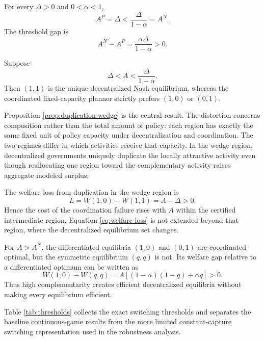 \begin{proposition}
\label{prop:threshold-ordering}
For every $\Delta>0$ and $0<\alpha<1$,
\begin{equation}
A^P=\Delta
<\frac{\Delta}{1-\alpha}=A^N.
\label{eq:threshold-ordering}
\end{equation}
The threshold gap is
\begin{equation}
A^N-A^P
=\frac{\alpha\Delta}{1-\alpha}>0.
\label{eq:threshold-gap}
\end{equation}
\end{proposition}

\begin{proposition}
\label{prop:duplication-wedge}
Suppose
\begin{equation}
\Delta<A<\frac{\Delta}{1-\alpha}.
\label{eq:wedge-region}
\end{equation}
Then $(1,1)$ is the unique decentralized Nash equilibrium, whereas the coordinated fixed-capacity planner strictly prefers $(1,0)$ or $(0,1)$.
\end{proposition}

Proposition \ref{prop:duplication-wedge} is the central result. The distortion concerns composition rather than the total amount of policy: each region has exactly the same fixed unit of policy capacity under decentralization and coordination. The two regimes differ in which activities receive that capacity. In the wedge region, decentralized governments uniquely duplicate the locally attractive activity even though reallocating one region toward the complementary activity raises aggregate modeled surplus.

The welfare loss from duplication in the wedge region is
\begin{equation}
L
=W(1,0)-W(1,1)
=A-\Delta>0.
\label{eq:welfare-loss}
\end{equation}
Hence the cost of the coordination failure rises with $A$ within the certified intermediate region. Equation \eqref{eq:welfare-loss} is not extended beyond that region, where the decentralized equilibrium set changes.

For $A>A^N$, the differentiated equilibria $(1,0)$ and $(0,1)$ are coordinated-optimal, but the symmetric equilibrium $(q,q)$ is not. Its welfare gap relative to a differentiated optimum can be written as
\begin{equation}
W(1,0)-W(q,q)
=A\left[(1-\alpha)(1-q)+\alpha q\right]>0.
\label{eq:highA-gap}
\end{equation}
Thus high complementarity creates efficient decentralized equilibria without making every equilibrium efficient.

Table \ref{tab:thresholds} collects the exact switching thresholds and separates the baseline continuous-game results from the more limited constant-capture switching representation used in the robustness analysis.


